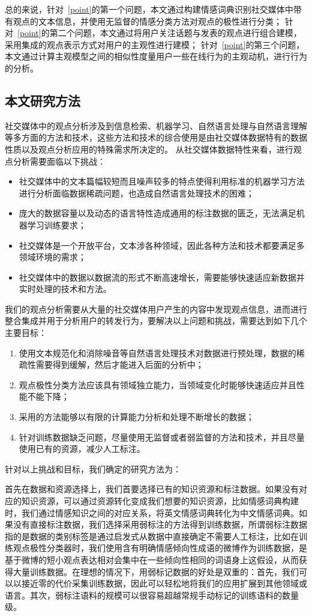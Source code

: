 总的来说，针对~\ref{point}的第一个问题，本文通过构建情感词典识别社交媒体中带有观点的文本信息，并使用无监督的情感分类方法对观点的极性进行分类；
针对~\ref{point}的第二个问题，本文通过将用户关注话题与发表的观点进行组合建模，采用集成的观点表示方式对用户的主观性进行建模；
针对~\ref{point}的第三个问题，本文通过计算主观模型之间的相似性度量用户一些在线行为的主观动机，进行行为的分析。

\subsection{本文研究方法}
社交媒体中的观点分析涉及到信息检索、机器学习、自然语言处理与自然语言理解等多方面的方法和技术，这些方法和技术的综合使用是由社交媒体数据特有的数据性质以及观点分析应用的特殊需求所决定的。
从社交媒体数据特性来看，进行观点分析需要面临以下挑战：
\begin{itemize}
\item 社交媒体中的文本篇幅较短而且噪声较多的特点使得利用标准的机器学习方法进行分析面临数据稀疏问题，也造成自然语言处理技术的困难；
\item 庞大的数据容量以及动态的语言特性造成通用的标注数据的匮乏，无法满足机器学习训练要求；
\item 社交媒体是一个开放平台，文本涉各种领域，因此各种方法和技术都要满足多领域环境的需求；
\item 社交媒体中的数据以数据流的形式不断高速增长，需要能够快速适应新数据并实时处理的技术和方法。
\end{itemize}

我们的观点分析需要从大量的社交媒体用户产生的内容中发现观点信息，进而进行整合集成并用于分析用户的转发行为，要解决以上问题和挑战，需要达到如下几个主要目标：
\begin{enumerate}
\item 使用文本规范化和消除噪音等自然语言处理技术对数据进行预处理，数据的稀疏性需要得到缓解，然后才能进入后面的分析中；
\item 观点极性分类方法应该具有领域独立能力，当领域变化时能够快速适应并且性能不能下降；
\item 采用的方法能够以有限的计算能力分析和处理不断增长的数据；
\item 针对训练数据缺乏问题，尽量使用无监督或者弱监督的方法和技术，并且尽量使用已有的资源，减少人工标注。
\end{enumerate}  

针对以上挑战和目标，我们确定的研究方法为：

首先在数据和资源选择上，我们首要选择已有的知识资源和标注数据。如果没有对应的知识资源，可以通过资源转化变成我们想要的知识资源，比如情感词典构建时，我们通过情感知识之间的对应关系，将英文情感词典转化为中文情感词典。如果没有直接标注数据，我们选择采用弱标注的方法得到训练数据，所谓弱标注数据指的是数据的类别标签是通过启发式从数据中直接确定不需要人工标注，比如在训练观点极性分类器时，我们使用含有明确情感倾向性成语的微博作为训练数据，是基于微博的短小观点表达相对会集中在一些倾向性相同的词语身上这假设，从而获得大量训练数据。在理想的情况下，用弱标记数据的好处是双重的：首先，我们可以以接近零的代价采集训练数据，因此可以轻松地将我们的应用扩展到其他领域或语言。其次，弱标注语料的规模可以很容易超越常规手动标记的训练语料的数量级。


